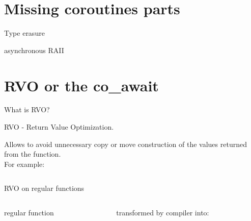 \documentclass[10pt]{beamer}
\begin{document}
\section{Missing coroutines parts}

\begin{frame}{Type erasure}
	

\end{frame}

\begin{frame}{asynchronous RAII}

\end{frame}


\section{RVO or the co\_await}

\begin{frame}{What is RVO?}
\centerline{\alert{RVO} - Return Value Optimization.}

\vfill

Allows to avoid unnecessary copy or move construction of the values returned from the function. \\
For example:

\pause

\inputminted[frame=single]{c++}{code-examples/RVO_examples/example.cpp}



\end{frame}

\begin{frame}[fragile]{RVO on regular functions}

\begin{columns}[T]
\begin{column}{0.4\linewidth}
\centerline{regular function}
\vfill
\inputminted{c++}{code-examples/RVO_examples/regular_function_rvo.cpp}
\vfill
\end{column}
\begin{column}{0.55\linewidth}
\centerline{transformed by compiler into:}
\vfill
\inputminted{c++}{code-examples/RVO_examples/transformed_function_rvo.cpp}
\vfill
\end{column}
\end{columns}

\end{frame}
\end{document}
